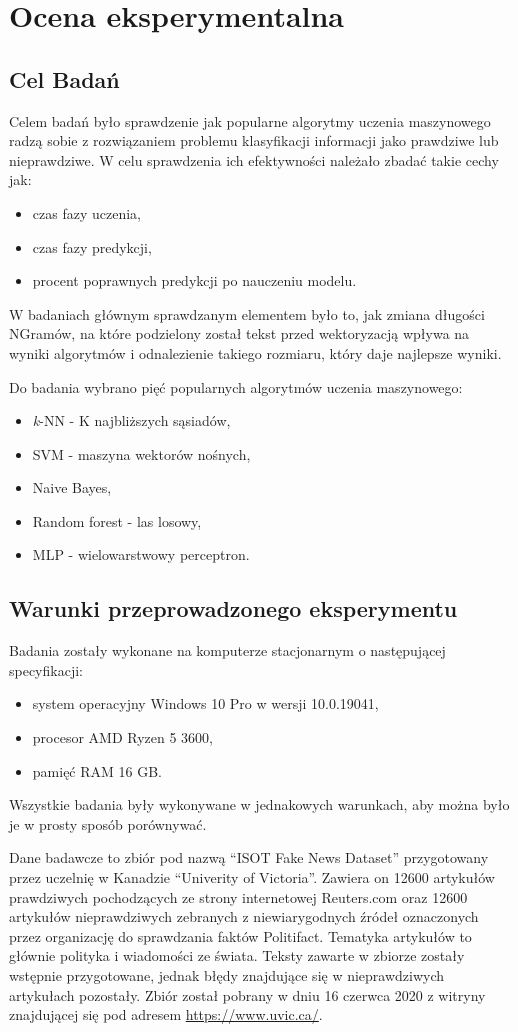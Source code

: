 \chapter{Ocena eksperymentalna}
\section{Cel Badań}
Celem badań było sprawdzenie jak popularne algorytmy uczenia maszynowego radzą sobie z rozwiązaniem problemu 
klasyfikacji informacji jako prawdziwe lub nieprawdziwe. W celu sprawdzenia ich efektywności należało zbadać
takie cechy jak:
\begin{itemize}
    \item czas fazy uczenia,
    \item czas fazy predykcji,
    \item procent poprawnych predykcji po nauczeniu modelu.
\end{itemize}
W badaniach głównym sprawdzanym elementem było to, jak zmiana długości NGramów, na które podzielony
został tekst przed wektoryzacją wpływa na wyniki algorytmów i odnalezienie takiego rozmiaru, który
daje najlepsze wyniki. 

Do badania wybrano pięć popularnych algorytmów uczenia maszynowego: 
\begin{itemize}
    \item \textit{k}-NN - K najbliższych sąsiadów,
    \item SVM - maszyna wektorów nośnych,
    \item Naive Bayes,
    \item Random forest - las losowy,
    \item MLP - wielowarstwowy perceptron.
\end{itemize} 
\section{Warunki przeprowadzonego eksperymentu}
Badania zostały wykonane na komputerze stacjonarnym o następującej specyfikacji:
\begin{itemize}
    \item system operacyjny Windows 10 Pro w wersji 10.0.19041,
    \item procesor AMD Ryzen 5 3600,
    \item pamięć RAM 16 GB.
\end{itemize}
Wszystkie badania były wykonywane w jednakowych warunkach, aby można było 
je w prosty sposób porównywać. 

Dane badawcze to zbiór pod nazwą ``ISOT Fake News Dataset'' przygotowany przez uczelnię w 
Kanadzie ``Univerity of Victoria''. Zawiera on 12600 artykułów prawdziwych pochodzących ze strony
internetowej Reuters.com oraz 12600 artykułów nieprawdziwych zebranych z niewiarygodnych źródeł
oznaczonych przez organizację do sprawdzania faktów Politifact. Tematyka artykułów to głównie polityka i wiadomości 
ze świata.  Teksty zawarte w zbiorze zostały wstępnie przygotowane, jednak błędy znajdujące się w nieprawdziwych 
artykułach pozostały. Zbiór został pobrany w dniu 16 czerwca 2020 z witryny znajdującej się pod adresem \url{https://www.uvic.ca/}.~\cite{ISOT}

